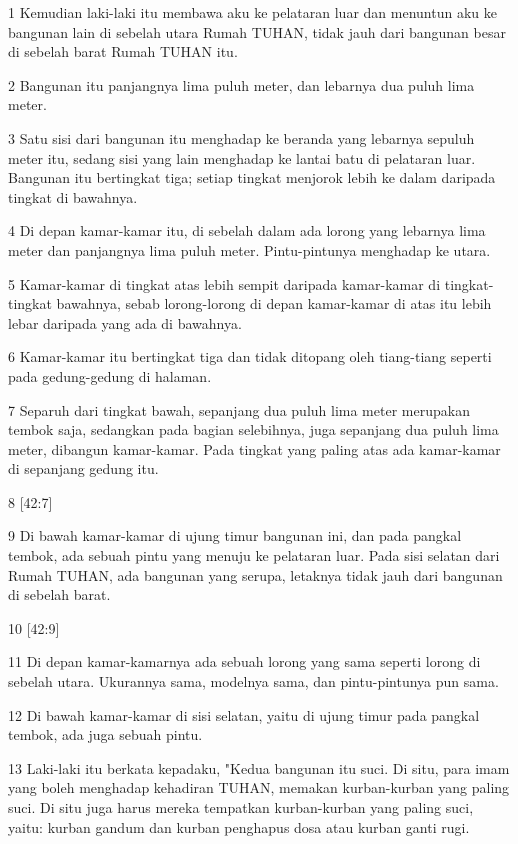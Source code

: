 \par 1 Kemudian laki-laki itu membawa aku ke pelataran luar dan menuntun aku ke bangunan lain di sebelah utara Rumah TUHAN, tidak jauh dari bangunan besar di sebelah barat Rumah TUHAN itu.
\par 2 Bangunan itu panjangnya lima puluh meter, dan lebarnya dua puluh lima meter.
\par 3 Satu sisi dari bangunan itu menghadap ke beranda yang lebarnya sepuluh meter itu, sedang sisi yang lain menghadap ke lantai batu di pelataran luar. Bangunan itu bertingkat tiga; setiap tingkat menjorok lebih ke dalam daripada tingkat di bawahnya.
\par 4 Di depan kamar-kamar itu, di sebelah dalam ada lorong yang lebarnya lima meter dan panjangnya lima puluh meter. Pintu-pintunya menghadap ke utara.
\par 5 Kamar-kamar di tingkat atas lebih sempit daripada kamar-kamar di tingkat-tingkat bawahnya, sebab lorong-lorong di depan kamar-kamar di atas itu lebih lebar daripada yang ada di bawahnya.
\par 6 Kamar-kamar itu bertingkat tiga dan tidak ditopang oleh tiang-tiang seperti pada gedung-gedung di halaman.
\par 7 Separuh dari tingkat bawah, sepanjang dua puluh lima meter merupakan tembok saja, sedangkan pada bagian selebihnya, juga sepanjang dua puluh lima meter, dibangun kamar-kamar. Pada tingkat yang paling atas ada kamar-kamar di sepanjang gedung itu.
\par 8 [42:7]
\par 9 Di bawah kamar-kamar di ujung timur bangunan ini, dan pada pangkal tembok, ada sebuah pintu yang menuju ke pelataran luar. Pada sisi selatan dari Rumah TUHAN, ada bangunan yang serupa, letaknya tidak jauh dari bangunan di sebelah barat.
\par 10 [42:9]
\par 11 Di depan kamar-kamarnya ada sebuah lorong yang sama seperti lorong di sebelah utara. Ukurannya sama, modelnya sama, dan pintu-pintunya pun sama.
\par 12 Di bawah kamar-kamar di sisi selatan, yaitu di ujung timur pada pangkal tembok, ada juga sebuah pintu.
\par 13 Laki-laki itu berkata kepadaku, "Kedua bangunan itu suci. Di situ, para imam yang boleh menghadap kehadiran TUHAN, memakan kurban-kurban yang paling suci. Di situ juga harus mereka tempatkan kurban-kurban yang paling suci, yaitu: kurban gandum dan kurban penghapus dosa atau kurban ganti rugi.
